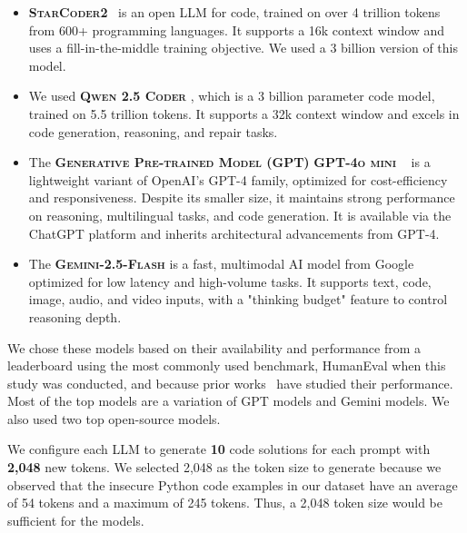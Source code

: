 \documentclass[pdflatex,sn-mathphys-ay]{sn-jnl}
\begin{document}
\begin{itemize}[leftmargin=*, label=-,noitemsep,topsep=0pt]

 \item \textbf{\textsc{StarCoder2}}~\cite{lozhkov2024starcoder2stackv2} is an open LLM for code, trained on over 4 trillion tokens from 600+ programming languages. It supports a 16k context window and uses a fill-in-the-middle training objective. We used a 3 billion version of this model.
 
\item We used \textbf{\textsc{Qwen 2.5 Coder}} \cite{hui2024qwen25codertechnicalreport}, which is a 3 billion parameter code model, trained on 5.5 trillion tokens. It supports a 32k context window and excels in code generation, reasoning, and repair tasks.


\item The \textbf{\textsc{Generative Pre-trained Model (GPT)}}  \textbf{\textsc{GPT-4o mini}} 
~\cite{openai2024gpt4omini} is a lightweight variant of OpenAI’s GPT-4 family, optimized for cost-efficiency and responsiveness. Despite its smaller size, it maintains strong performance on reasoning, multilingual tasks, and code generation. It is available via the ChatGPT platform and inherits architectural advancements from GPT-4.

\item The \textbf{\textsc{Gemini-2.5-Flash}} \cite{deepmind2025geminiflash} is a fast, multimodal AI model from Google optimized for low latency and high-volume tasks. It supports text, code, image, audio, and video inputs, with a "thinking budget" feature to control reasoning depth.

\end{itemize}


We chose these models based on their availability and performance from a leaderboard using the most commonly used benchmark, HumanEval \cite{humanevalleaderboard} when this study was conducted, and because prior works~\cite{openai2023gpt4, nijkamp2023codegen2,siddiq2022seceval,siddiq2024regexeval,siddiq2023franc,siddiq2024devgpt}  have studied their performance. Most of the top models are a variation of GPT models and Gemini models. We also used two top open-source models.

We configure each LLM to generate \textbf{10} code solutions for each prompt with \textbf{2,048} new tokens. We selected 2,048 as the token size to generate because we observed that the insecure Python code examples in our dataset have an average of 54 tokens and a maximum of 245 tokens. Thus, a 2,048 token size would be sufficient for the models. 
\end{document}
